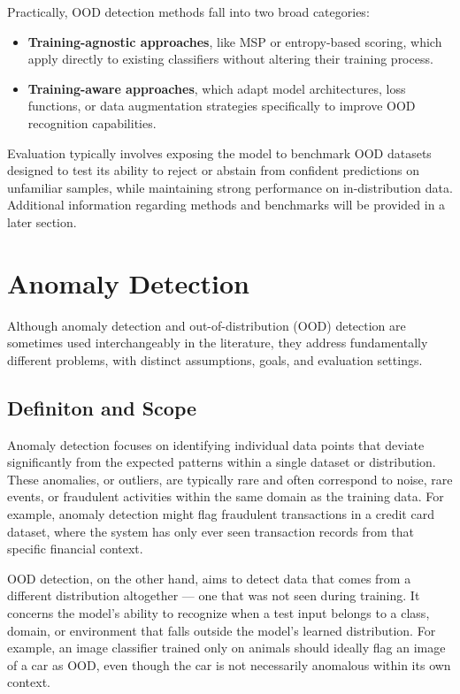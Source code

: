 \documentclass[11pt, oneside]{book}
\theoremstyle{plain}
\theoremstyle{definition}
\theoremstyle{remark}
\begin{document}
Practically, OOD detection methods fall into two broad categories:
\begin{itemize}
    \item \textbf{Training-agnostic approaches}, like MSP or entropy-based scoring, which apply directly to existing classifiers without altering their training process.
    \item \textbf{Training-aware approaches}, which adapt model architectures, loss functions, or data augmentation strategies specifically to improve OOD recognition capabilities.
\end{itemize}

Evaluation typically involves exposing the model to benchmark OOD datasets designed to test its ability to reject or abstain from confident predictions on unfamiliar samples, while maintaining strong performance on in-distribution data. Additional information regarding methods and benchmarks will be provided in a later section. 


\section{Anomaly Detection}

Although anomaly detection and out-of-distribution (OOD) detection are sometimes used interchangeably in the literature, they address fundamentally different problems, with distinct assumptions, goals, and evaluation settings.

\subsection{Definiton and Scope}

Anomaly detection focuses on identifying individual data points that deviate significantly from the expected patterns within a single dataset or distribution. These anomalies, or outliers, are typically rare and often correspond to noise, rare events, or fraudulent activities within the same domain as the training data. For example, anomaly detection might flag fraudulent transactions in a credit card dataset, where the system has only ever seen transaction records from that specific financial context.

OOD detection, on the other hand, aims to detect data that comes from a different distribution altogether — one that was not seen during training. It concerns the model’s ability to recognize when a test input belongs to a class, domain, or environment that falls outside the model’s learned distribution. For example, an image classifier trained only on animals should ideally flag an image of a car as OOD, even though the car is not necessarily anomalous within its own context.
\end{document}
